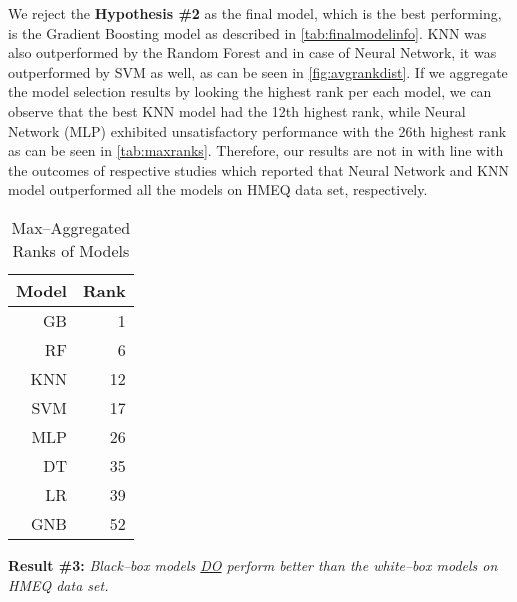 We reject the \textbf{Hypothesis \#2} as the final model, which is the best performing, is the Gradient Boosting model as described in \autoref{tab:finalmodelinfo}.
KNN was also outperformed by the Random Forest and in case of Neural Network, it was outperformed by SVM as well, as can be seen in \autoref{fig:avgrankdist}.
If we aggregate the model selection results by looking the highest rank per each model, we can observe that the best KNN model had the 12th highest rank, while Neural Network (MLP) exhibited unsatisfactory performance with the 26th highest rank as can be seen in \autoref{tab:maxranks}.
Therefore, our results are not in with line with the outcomes of respective studies \citep{serkan2021bagging,zurada2014classification} which reported that Neural Network and KNN model outperformed all the models on HMEQ data set, respectively.

\begin{table}[H]
    \small
    \setlength{\tabcolsep}{8pt}
    \renewcommand{\arraystretch}{1.3}
    \centering
        \caption[Max--Aggregated Ranks of Models]{Max--Aggregated Ranks of Models}\label{tab:maxranks}
        \begin{tabular}{r r}
    \toprule
    \textbf{Model} & \textbf{Rank}\\
    \midrule
    \hline
    GB & 1 \\ 
    RF & 6 \\ 
    KNN & 12 \\ 
    SVM & 17 \\ 
    MLP & 26 \\ 
    DT & 35 \\ 
    LR & 39 \\
    GNB & 52 \\
    \hline
    \bottomrule
    \end{tabular}
    \vspace{0.35em}

        \vspace{-1em}
\end{table}

\vspace{0.3cm}

\noindent \textbf{Result \#3:} \textit{Black--box models \underline{DO} perform better than the white--box models on HMEQ data set.}

